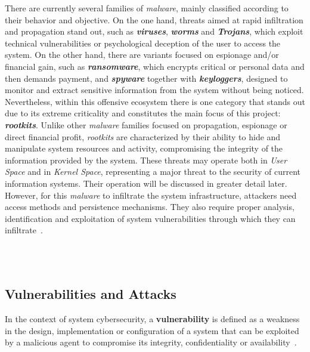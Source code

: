 There are currently several families of \textit{malware}, mainly classified according to their behavior and objective.
On the one hand, threats aimed at rapid infiltration and propagation stand out, such as \textbf{\textit{viruses}}, \textbf{\textit{worms}} and \textbf{\textit{Trojans}}, which exploit technical vulnerabilities or psychological deception of the user to access the system.
On the other hand, there are variants focused on espionage and/or financial gain, such as \textbf{\textit{ransomware}}, which encrypts critical or personal data and then demands payment, and \textbf{\textit{spyware}} together with \textbf{\textit{keyloggers}}, designed to monitor and extract sensitive information from the system without being noticed.\\

Nevertheless, within this offensive ecosystem there is one category that stands out due to its extreme criticality and constitutes the main focus of this project: \textbf{\textit{rootkits}}.
Unlike other \textit{malware} families focused on propagation, espionage or direct financial profit, \textit{rootkits} are characterized by their ability to hide and manipulate system resources and activity, compromising the integrity of the information provided by the system.
These threats may operate both in \textit{User Space} and in \textit{Kernel Space}, representing a major threat to the security of current information systems.
Their operation will be discussed in greater detail later.\\

However, for this \textit{malware} to infiltrate the system infrastructure, attackers need access methods and persistence mechanisms.
They also require proper analysis, identification and exploitation of system vulnerabilities through which they can infiltrate~\cite{mitre_attack}.\\

\

\

\subsection{Vulnerabilities and Attacks}
\label{sec:ataques}

In the context of system cybersecurity, a \textbf{vulnerability} is defined as a weakness in the design, implementation or configuration of a system that can be exploited by a malicious agent to compromise its integrity, confidentiality or availability~\cite{threat_enisa}.\\

